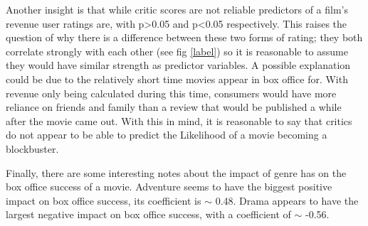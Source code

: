    Another insight is that while critic scores are not reliable predictors of a
        film's revenue user ratings are, with p>0.05 and p<0.05 respectively.
    This raises the question of why there is a difference between these two forms of rating; they both correlate
        strongly with each other (see fig \ref{label}) so it is reasonable to assume they would have similar 
        strength as predictor variables.
    A possible explanation could be due to the relatively short time movies appear in box office for.
    With revenue only being calculated during this time, consumers would have more reliance on friends
        and family than a review that would be published a while after the movie came out.
    With this in mind, it is reasonable to say that critics do not appear to be able to predict the Likelihood
        of a movie becoming a blockbuster.
    
    Finally, there are some interesting notes about the impact of genre has on the box office success of a movie.
    Adventure seems to have the biggest positive impact on box office success, its coefficient is $\sim$ 0.48.
    Drama appears to have the largest negative impact on box office success, with a coefficient of $\sim$ -0.56.




